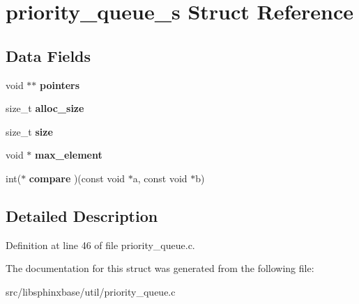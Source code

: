 \section{priority\+\_\+queue\+\_\+s Struct Reference}
\label{structpriority__queue__s}
\subsection*{Data Fields}
\begin{DoxyCompactItemize}
\item 
\mbox{\label{structpriority__queue__s_a2d83272d62f250d2f685f500d7b5a865}} 
void $\ast$$\ast$ {\bfseries pointers}
\item 
\mbox{\label{structpriority__queue__s_ae97c85552234938ef5bf84d2bbd06f75}} 
size\+\_\+t {\bfseries alloc\+\_\+size}
\item 
\mbox{\label{structpriority__queue__s_a797e9b9767bae286b06d5b57e9f4a11a}} 
size\+\_\+t {\bfseries size}
\item 
\mbox{\label{structpriority__queue__s_a805c395ea39df723cf6d6d9468f2a05e}} 
void $\ast$ {\bfseries max\+\_\+element}
\item 
\mbox{\label{structpriority__queue__s_a67b713733cb1a7da98f715c5b1a18d34}} 
int($\ast$ {\bfseries compare} )(const void $\ast$a, const void $\ast$b)
\end{DoxyCompactItemize}


\subsection{Detailed Description}


Definition at line 46 of file priority\+\_\+queue.\+c.



The documentation for this struct was generated from the following file\+:\begin{DoxyCompactItemize}
\item 
src/libsphinxbase/util/priority\+\_\+queue.\+c\end{DoxyCompactItemize}
